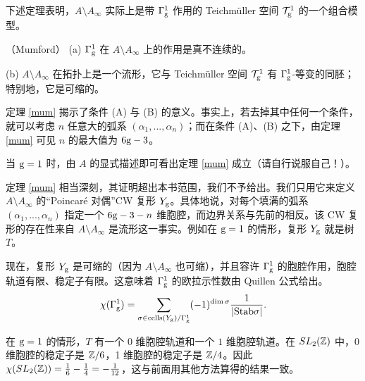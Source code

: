 下述定理表明，$A\setminus A_\infty$ 实际上是带 $\Gamma_{\rm g}^1$ 作用的 Teichmüller 空间 ${\mathcal T}_{\rm g}^1$ 的一个组合模型。

\begin{theorem} \label{mum}（Mumford）
(a) $\Gamma_{\rm g}^1$ 在 $A\setminus A_\infty$ 上的作用是真不连续的。

(b) $A\setminus A_\infty$ 在拓扑上是一个流形，它与 Teichmüller 空间 ${\mathcal T}_{\rm g}^1$ 有 $\Gamma_{\rm g}^1$-等变的同胚；特别地，它是可缩的。
\end{theorem}

\begin{remark} 定理 \ref{mum} 揭示了条件 (A) 与 (B) 的意义。事实上，若去掉其中任何一个条件，就可以考虑 $n$ 任意大的弧系 $(\alpha_1,...,\alpha_n)$；而在条件 (A)、(B) 之下，由定理 \ref{mum} 可见 $n$ 的最大值为 $6{\rm g}-3$。
\end{remark}

\begin{remark} 当 ${\rm g}=1$ 时，由 $A$ 的显式描述即可看出定理 \ref{mum} 成立（请自行说服自己！）。
\end{remark}

定理 \ref{mum} 相当深刻，其证明超出本书范围，我们不予给出。我们只用它来定义 $A\setminus A_\infty$ 的“Poincaré 对偶”CW 复形 $Y_{\rm g}$。具体地说，对每个填满的弧系 $(\alpha_1,...,\alpha_n)$ 指定一个 $6{\rm g}-3-n$ 维胞腔，而边界关系与先前的相反。该 CW 复形的存在性来自 $A\setminus A_\infty$ 是流形这一事实。例如在 ${\rm g}=1$ 的情形，复形 $Y_{\rm g}$ 就是树 $T$。

现在，复形 $Y_{\rm g}$ 是可缩的（因为 $A\setminus A_\infty$ 也可缩），并且容许 $\Gamma_{\rm g}^1$ 的胞腔作用，胞腔轨道有限、稳定子有限。这意味着 $\Gamma_{\rm g}^1$ 的欧拉示性数由 Quillen 公式给出。
$$
\chi(\Gamma_{\rm g}^1)=\sum_{\sigma\in {\rm
    cells}(Y_{\rm g})/\Gamma_{\rm g}^1}
(-1)^{\dim\sigma}\frac{1}{|{\rm Stab\sigma}|}.
$$


\begin{example} 在 ${\rm g}=1$ 的情形，$T$ 有一个 $0$ 维胞腔轨道和一个 $1$ 维胞腔轨道。在 $SL_2(\Bbb Z)$ 中，0 维胞腔的稳定子是 $\Bbb Z/6$，1 维胞腔的稳定子是 $\Bbb Z/4$。因此 $\chi(SL_2(\Bbb Z))=\frac{1}{6}-\frac{1}{4}=-\frac{1}{12}$，这与前面用其他方法算得的结果一致。
\end{example}

